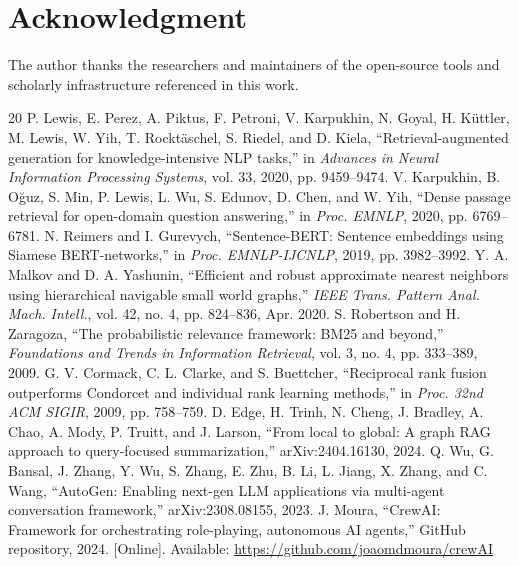 \documentclass[conference]{IEEEtran}
\begin{document}
\section*{Acknowledgment}
The author thanks the researchers and maintainers of the open-source tools and scholarly infrastructure referenced in this work.
\balance
\FloatBarrier
\begin{thebibliography}{20}
P. Lewis, E. Perez, A. Piktus, F. Petroni, V. Karpukhin, N. Goyal, H. K\"uttler, M. Lewis, W. Yih, T. Rockt\"aschel, S. Riedel, and D. Kiela, ``Retrieval-augmented generation for knowledge-intensive NLP tasks,'' in \textit{Advances in Neural Information Processing Systems}, vol. 33, 2020, pp. 9459--9474.
V. Karpukhin, B. O\u{g}uz, S. Min, P. Lewis, L. Wu, S. Edunov, D. Chen, and W. Yih, ``Dense passage retrieval for open-domain question answering,'' in \textit{Proc. EMNLP}, 2020, pp. 6769--6781.
N. Reimers and I. Gurevych, ``Sentence-BERT: Sentence embeddings using Siamese BERT-networks,'' in \textit{Proc. EMNLP-IJCNLP}, 2019, pp. 3982--3992.
Y. A. Malkov and D. A. Yashunin, ``Efficient and robust approximate nearest neighbors using hierarchical navigable small world graphs,'' \textit{IEEE Trans. Pattern Anal. Mach. Intell.}, vol. 42, no. 4, pp. 824--836, Apr. 2020.
S. Robertson and H. Zaragoza, ``The probabilistic relevance framework: BM25 and beyond,'' \textit{Foundations and Trends in Information Retrieval}, vol. 3, no. 4, pp. 333--389, 2009.
G. V. Cormack, C. L. Clarke, and S. Buettcher, ``Reciprocal rank fusion outperforms Condorcet and individual rank learning methods,'' in \textit{Proc. 32nd ACM SIGIR}, 2009, pp. 758--759.
D. Edge, H. Trinh, N. Cheng, J. Bradley, A. Chao, A. Mody, P. Truitt, and J. Larson, ``From local to global: A graph RAG approach to query-focused summarization,'' arXiv:2404.16130, 2024.
Q. Wu, G. Bansal, J. Zhang, Y. Wu, S. Zhang, E. Zhu, B. Li, L. Jiang, X. Zhang, and C. Wang, ``AutoGen: Enabling next-gen LLM applications via multi-agent conversation framework,'' arXiv:2308.08155, 2023.
J. Moura, ``CrewAI: Framework for orchestrating role-playing, autonomous AI agents,'' GitHub repository, 2024. [Online]. Available: \url{https://github.com/joaomdmoura/crewAI}

\end{thebibliography}
\end{document}
